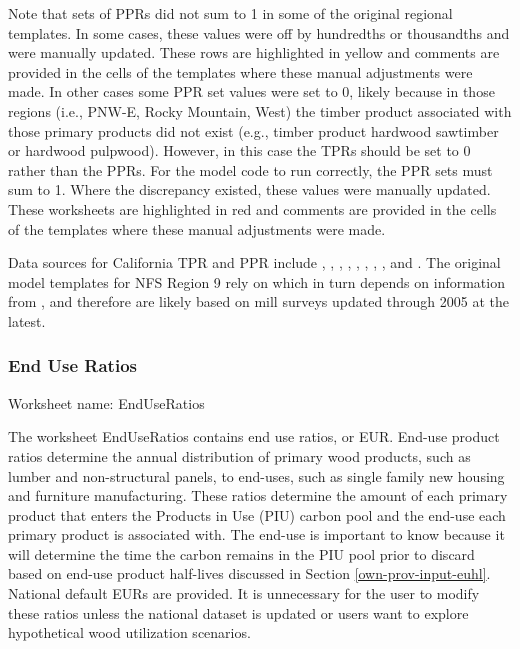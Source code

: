 \documentclass[
  openany]{book}
\begin{document}
Note that sets of PPRs did not sum to 1 in some of the original regional templates. In some cases, these values were off by hundredths or thousandths and were manually updated. These rows are highlighted in yellow and comments are provided in the cells of the templates where these manual adjustments were made. In other cases some PPR set values were set to 0, likely because in those regions (i.e., PNW-E, Rocky Mountain, West) the timber product associated with those primary products did not exist (e.g., timber product hardwood sawtimber or hardwood pulpwood). However, in this case the TPRs should be set to 0 rather than the PPRs. For the model code to run correctly, the PPR sets must sum to 1. Where the discrepancy existed, these values were manually updated. These worksheets are highlighted in red and comments are provided in the cells of the templates where these manual adjustments were made.

Data sources for California TPR and PPR include \textcite{barrette1970}, \textcite{hiserote1978}, \textcite{howard1974}, \textcite{marcille2020}, \textcite{mciver2015}, \textcite{morgan2004}, \textcite{morgan2012}, \textcite{ward1995}, and \textcite{ward1997}. The original model templates for NFS Region 9 rely on \textcite{smith2006} which in turn depends on information from \textcite{adams2006}, and therefore are likely based on mill surveys updated through 2005 at the latest.

\hypertarget{own-prov-input-eur}{%
\subsubsection{End Use Ratios}\label{own-prov-input-eur}}

Worksheet name: EndUseRatios

The worksheet EndUseRatios contains end use ratios, or EUR. End-use product ratios determine the annual distribution of primary wood products, such as lumber and non-structural panels, to end-uses, such as single family new housing and furniture manufacturing. These ratios determine the amount of each primary product that enters the Products in Use (PIU) carbon pool and the end-use each primary product is associated with. The end-use is important to know because it will determine the time the carbon remains in the PIU pool prior to discard based on end-use product half-lives discussed in Section \ref{own-prov-input-euhl}. National default EURs are provided. It is unnecessary for the user to modify these ratios unless the national dataset is updated or users want to explore hypothetical wood utilization scenarios.
\end{document}
